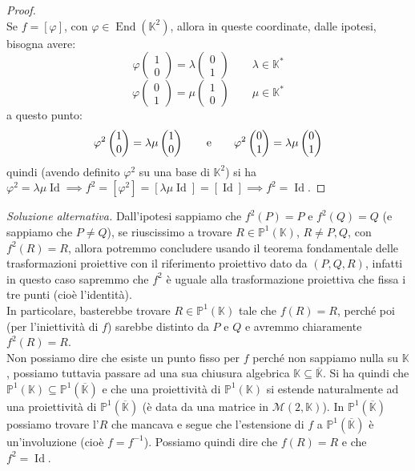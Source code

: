 \documentclass[12pt]{article}
\theoremstyle{remark}
\theoremstyle{definition}
\newenvironment{solution}{\renewcommand{\proofname}{Soluzione}\begin{proof}}{\end{proof}}
\newcommand{\PP}{\mathbb{P}}
\newcommand{\KK}{\mathbb{K}}
\newcommand{\M}{\mathcal{M}}
\DeclareMathOperator{\id}{Id}
\DeclareMathOperator{\End}{End}
\begin{document}
\begin{solution}
\[    \]
  Se $f = [\varphi]$, con $\varphi \in \End(\KK^2)$, allora in queste coordinate, dalle ipotesi, bisogna avere:
  \[ \varphi\begin{pmatrix} 1 \\ 0\end{pmatrix} = \lambda \begin{pmatrix} 0 \\ 1\end{pmatrix} \qquad \lambda \in \KK^*
    \]\[ \varphi\begin{pmatrix} 0 \\ 1\end{pmatrix} = \mu \begin{pmatrix} 1 \\ 0\end{pmatrix} \qquad \mu \in \KK^*
      \]
  a questo punto:
  \[ \varphi^2\begin{pmatrix} 1 \\ 0\end{pmatrix} = \lambda\mu \begin{pmatrix} 1 \\ 0\end{pmatrix} \qquad \text e \qquad \varphi^2\begin{pmatrix} 0 \\ 1\end{pmatrix} = \lambda\mu \begin{pmatrix} 0 \\ 1\end{pmatrix}
    \]
  quindi (avendo definito $\varphi^2$ su una base di $\KK^2$) si ha $\varphi^2 = \lambda \mu \id \implies f^2 = [\varphi^2] = [\lambda\mu \id] = [\id] \implies f^2 = \id$.
\end{solution}

\textit{Soluzione alternativa.} Dall'ipotesi sappiamo che $f^2(P) = P$ e $f^2(Q) = Q$ (e sappiamo che $P \ne Q$), se riuscissimo a trovare $R \in \PP^1(\KK)$, $R \ne P,Q$, con $f^2(R) = R$, allora potremmo concludere usando il teorema fondamentale delle trasformazioni proiettive con il riferimento proiettivo dato da 
$(P,Q,R)$, infatti in questo caso sapremmo che $f^2$ è uguale alla trasformazione proiettiva che fissa i tre punti (cioè l'identità). \\In particolare, basterebbe trovare $R \in \PP^1(\KK)$ tale che $f(R) = R$, perché poi (per l'iniettività di $f$) sarebbe distinto da $P$ e $Q$ e avremmo chiaramente $f^2(R) = R$.\\
Non possiamo dire che esiste un punto fisso per $f$ perché non sappiamo nulla su $\KK$, possiamo tuttavia passare ad una sua chiusura algebrica $\KK \subseteq \overline{\KK}$. Si ha quindi che $\PP^1(\KK) \subseteq \PP^1(\overline{\KK})$ e che una proiettività di $\PP^1(\KK)$ si estende naturalmente ad una proiettività di $\PP^1(\overline{\KK})$ (è data da una matrice in $\M(2,\KK)$).
In $\PP^1(\overline{\KK})$ possiamo trovare l'$R$ che mancava e segue che l'estensione di $f$ a $\PP^1(\overline{\KK})$ è un'involuzione (cioè $f = f^{-1}$). 
Possiamo quindi dire che $f(R) = R$ e che $f^2 = \id$.
\end{document}

